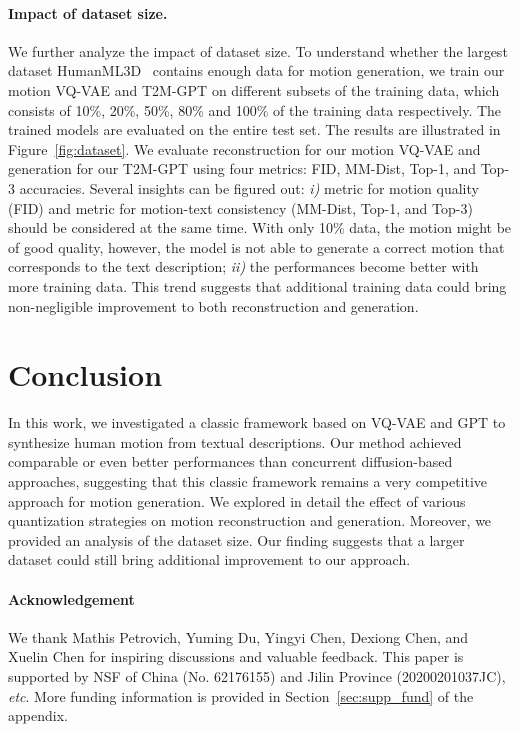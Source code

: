 \documentclass[10pt,twocolumn,letterpaper]{article}
\begin{document}
\paragraph{Impact of dataset size.} We further analyze the impact of dataset size. To understand whether the largest dataset HumanML3D~\cite{guo2022generating} contains enough data for motion generation, we train our motion VQ-VAE and T2M-GPT on different subsets of the training data, which consists of 10\%, 20\%, 50\%, 80\% and 100\% of the training data respectively. The trained models are evaluated on the entire test set. The results are illustrated in Figure~\ref{fig:dataset}. We evaluate reconstruction for our motion VQ-VAE and generation for our T2M-GPT using four metrics: FID, MM-Dist, Top-1, and Top-3 accuracies. Several insights can be figured out: \textit{i)} metric for motion quality (FID) and metric for motion-text consistency (MM-Dist, Top-1, and Top-3) should be considered at the same time. With only 10\% data, the motion might be of good quality, however, the model is not able to generate a correct motion that corresponds to the text description; \textit{ii)} the performances become better with more training data. This trend suggests that additional training data could bring non-negligible improvement to both reconstruction and generation. 


\section{Conclusion}
\label{sec:con}

In this work, we investigated a classic framework based on VQ-VAE and GPT to synthesize human motion from textual descriptions. Our method achieved comparable or even better performances than concurrent diffusion-based approaches, 
suggesting that this classic framework remains a very competitive approach for motion generation. We explored in detail the effect of various quantization strategies on motion reconstruction and generation. Moreover, we provided an analysis of the dataset size. Our finding suggests that a larger dataset could still bring additional improvement to our approach.
\paragraph{Acknowledgement} We thank Mathis Petrovich, Yuming Du, Yingyi Chen, Dexiong Chen, and Xuelin Chen for inspiring discussions and valuable feedback. This paper is supported by NSF of China (No. 62176155) and Jilin Province (20200201037JC), \textit{etc}. More funding information is provided in Section~\ref{sec:supp_fund} of the appendix.
\end{document}
